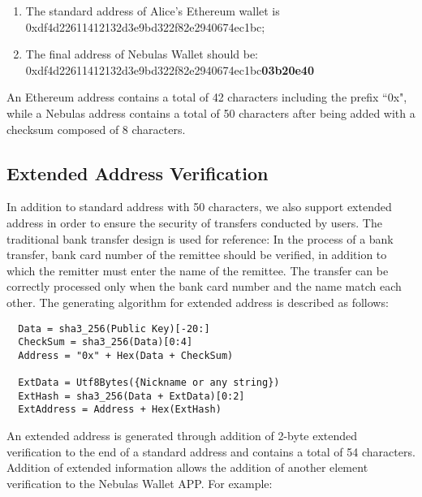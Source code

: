 \begin{enumerate}
  \item  The standard address of Alice’s Ethereum wallet is 0xdf4d22611412132d3e9bd322f82e2940674ec1bc;
  \item  The final address of Nebulas Wallet should be: \\ 0xdf4d22611412132d3e9bd322f82e2940674ec1bc\textbf{03b20e40}
\end{enumerate}

An Ethereum address contains a total of 42 characters including the prefix ``0x", while a Nebulas address contains a total of 50 characters after being added with a checksum composed of 8 characters.


\subsection{Extended Address Verification}
In addition to standard address with 50 characters, we also support extended address in order to ensure the security of transfers conducted by users. The traditional bank transfer design is used for reference: In the process of a bank transfer, bank card number of the remittee should be verified, in addition to which the remitter must enter the name of the remittee. The transfer can be correctly processed only when the bank card number and the name match each other. The generating algorithm for extended address is described as follows:


\begin{verbatim}
  Data = sha3_256(Public Key)[-20:]
  CheckSum = sha3_256(Data)[0:4]
  Address = "0x" + Hex(Data + CheckSum)

  ExtData = Utf8Bytes({Nickname or any string})
  ExtHash = sha3_256(Data + ExtData)[0:2]
  ExtAddress = Address + Hex(ExtHash)
\end{verbatim}

An extended address is generated through addition of 2-byte extended verification to the end of a standard address and contains a total of 54 characters. Addition of extended information allows the addition of another element verification to the Nebulas Wallet APP. For example:

